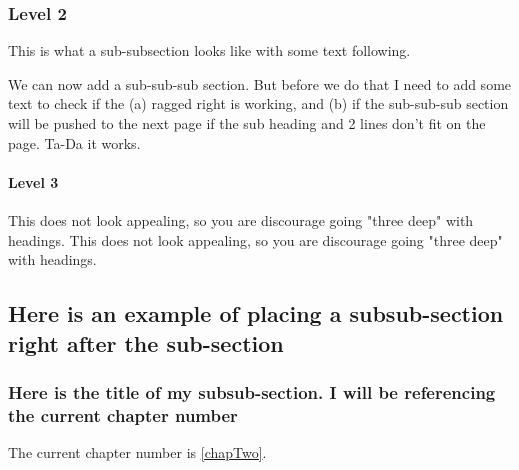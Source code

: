 \subsubsection{Level 2}

This is what a sub-subsection looks like with some text following. \lipsum[2]

We can now add a sub-sub-sub section. But before we do that I need to add some text to check if the (a) ragged right is working, and (b) if the sub-sub-sub section will be pushed to the next page if the sub heading and 2 lines don't fit on the page. Ta-Da it works.


\paragraph{Level 3}

This does not look appealing, so you are discourage going "three deep" with headings. This does not look appealing, so you are discourage going "three deep" with headings.
\subsection{Here is an example of placing a subsub-section right after the sub-section}
\subsubsection{Here is the title of my subsub-section. I will be referencing the current chapter number}
The current chapter number is \ref{chapTwo}.